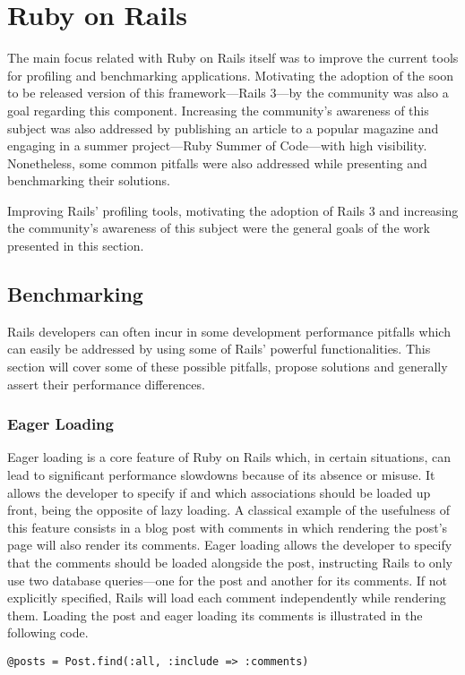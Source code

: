 \section{Ruby on Rails} %
\label{solution:sec:ruby_on_rails}
The main focus related with Ruby on Rails itself was to improve the current tools for profiling and benchmarking applications. Motivating the adoption of the soon to be released version of this framework---Rails 3---by the community was also a goal regarding this component. Increasing the community's awareness of this subject was also addressed by publishing an article to a popular magazine and engaging in a summer project---Ruby Summer of Code---with high visibility. Nonetheless, some common pitfalls were also addressed while presenting and benchmarking their solutions.

Improving Rails' profiling tools, motivating the adoption of Rails 3 and increasing the community's awareness of this subject were the general goals of the work presented in this section.


\subsection{Benchmarking}
Rails developers can often incur in some development performance pitfalls which can easily be addressed by using some of Rails' powerful functionalities. This section will cover some of these possible pitfalls, propose solutions and generally assert their performance differences.


\subsubsection{Eager Loading}
Eager loading is a core feature of Ruby on Rails which, in certain situations, can lead to significant performance slowdowns because of its absence or misuse. It allows the developer to specify if and which associations should be loaded up front, being the opposite of lazy loading. A classical example of the usefulness of this feature consists in a blog post with comments in which rendering the post's page will also render its comments. Eager loading allows the developer to specify that the comments should be loaded alongside the post, instructing Rails to only use two database queries---one for the post and another for its comments. If not explicitly specified, Rails will load each comment independently while rendering them. Loading the post and eager loading its comments is illustrated in the following code.
\begin{lstlisting}[xleftmargin=30pt,xrightmargin=30pt]
@posts = Post.find(:all, :include => :comments)
\end{lstlisting}

